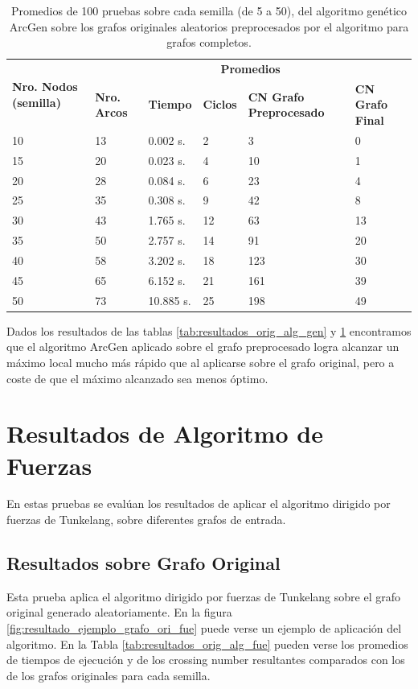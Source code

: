 \begin{table}[H]
	\caption{Promedios de 100 pruebas sobre cada semilla (de 5 a 50), del algoritmo genético ArcGen sobre los grafos originales aleatorios preprocesados por el algoritmo para grafos completos.}
	\label{tab:resultados_com_alg_gen}
	\begin{tabularx}{\linewidth}{|p{1.5cm}|p{1.2cm}|p{1.5cm}|p{1.5cm}|X|X|}
		\hline
		\multirow{2}{2cm}{\textbf{Nro. Nodos (semilla)}} & \multicolumn{5}{c|}{\textbf{Promedios}} \\
		\cline{2-6}
		& \textbf{Nro. Arcos} & \textbf{Tiempo} & \textbf{Ciclos} & \textbf{CN Grafo Preprocesado} & \textbf{CN Grafo Final} \\
		\hline
		10 & 13 & 0.002 s. & 2 & 3 & 0 \\
		\hline
		15 & 20 & 0.023 s. & 4 & 10 & 1 \\
		\hline
		20 & 28 & 0.084 s. & 6 & 23 & 4 \\
		\hline
		25 & 35 & 0.308 s. & 9 & 42 & 8 \\
		\hline
		30 & 43 & 1.765 s. & 12 & 63 & 13 \\
		\hline
		35 & 50 & 2.757 s. & 14 & 91 & 20 \\
		\hline
		40 & 58 & 3.202 s. & 18 & 123 & 30 \\
		\hline
		45 & 65 & 6.152 s. & 21 & 161 & 39 \\
		\hline
		50 & 73 & 10.885 s. & 25 & 198 & 49 \\
		\hline
	\end{tabularx}
\end{table}

Dados los resultados de las tablas \ref{tab:resultados_orig_alg_gen} y \ref{tab:resultados_com_alg_gen} encontramos que el algoritmo ArcGen aplicado sobre el grafo preprocesado logra alcanzar un máximo local mucho más rápido que al aplicarse sobre el grafo original, pero a coste de que el máximo alcanzado sea menos óptimo.

\section{Resultados de Algoritmo de Fuerzas}
En estas pruebas se evalúan los resultados de aplicar el algoritmo dirigido por fuerzas de Tunkelang, sobre diferentes grafos de entrada.

\subsection{Resultados sobre Grafo Original}
Esta prueba aplica el algoritmo dirigido por fuerzas de Tunkelang sobre el grafo original generado aleatoriamente. En la figura \ref{fig:resultado_ejemplo_grafo_ori_fue} puede verse un ejemplo de aplicación del algoritmo. En la Tabla \ref{tab:resultados_orig_alg_fue} pueden verse los promedios de tiempos de ejecución y de los crossing number resultantes comparados con los de los grafos originales para cada semilla.

